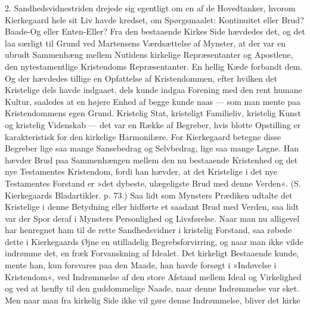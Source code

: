 \documentclass[12pt,a4paper,openany]{book}
\newcommand{\opage}[1]{\marginnote{\footnotesize\textit{[#1]}}}
\begin{document}
2. Sandhedsvidnestriden drejede sig egentligt om en
af de Hovedtanker, hvorom Kierkegaard hele sit Liv
havde kredset, om Spørgsmaalet: Kontinuitet eller Brud?
Baade-Og eller Enten-Eller? Fra den bestaaende Kirkes
\opage{145}Side hævdedes det, og det laa særligt til Grund ved
Martensens Værdsættelse af Mynster, at der var en
ubrudt Sammenhæng mellem Nutidens kirkelige Repræsentanter
og Apostlene, den nytestamentlige Kristendoms
Repræsentanter. En hellig Kæde forbandt dem. Og der
hævdedes tillige en Opfattelse af Kristendommen, efter
hvilken det Kristelige dels havde indgaaet, dels kunde indgaa
Forening med den rent humane Kultur, saaledes at
en højere Enhed af begge kunde naas --- som man mente
paa Kristendommens egen Grund. Kristelig Stat, kristeligt
Familieliv, kristelig Kunst og kristelig Videnskab --- det
var en Række af Begreber, hvis blotte Opstilling er
karakteristisk for den kirkelige Harmonilære. For
Kierkegaard betegne disse Begreber lige saa mange
Sansebedrag og Selvbedrag, lige saa mange Løgne. Han
hævder Brud paa Sammenhængen mellem den nu bestaaende
Kristenhed og det nye Testamentes Kristendom,
fordi han hævder, at det Kristelige i det nye Testamentes
Forstand er »det dybeste, ulægeligste Brud med denne
Verden«. (S. Kierkegaards Bladartikler. p. 73.) Saa
lidt som Mynsters Prædiken udtalte det Kristelige i
denne Betydning eller hidførte et saadant Brud med
Verden, saa lidt var der Spor deraf i Mynsters Personlighed
og Livsførelse. Naar man nu alligevel har henregnet
ham til de rette Sandhedsvidner i kristelig Forstand,
saa røbede dette i Kierkegaards Øjne en utilladelig
Begrebsforvirring, og naar man ikke vilde indrømme det,
en fræk Forvanskning af Idealet. Det kirkeligt Bestaaende
kunde, mente han, kun forsvares paa den Maade,
han havde forsøgt i »Indøvelse i Kristendom«, ved Indrømmelse
af den store Afstand mellem Ideal og Virkelighed
og ved at henfly til den guddommelige Naade, naar
denne Indrømmelse var sket. Men naar man fra kirkelig
Side ikke vil gøre denne Indrømmelse, bliver det kirke%
\end{document}
